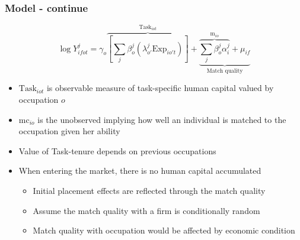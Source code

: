 \documentclass[11pt]{beamer}
\begin{document}
\begin{frame}
	\frametitle{Model - continue}
	\begin{equation*}
		\log{Y_{ifot}^j} = \gamma_o\overbrace{\left[  \sum_j \beta_{o}^j \left(\lambda_{o'}^j \text{Exp}_{io't} \right)\right]}^{\text{Task}_{iot}} + \underbrace{\overbrace{\sum_j \beta_{o}^j \alpha_{i}^j }^{\text{m}_{io}}+\mu_{if}}_{\text{Match quality}} \tag{6}
	\end{equation*}
	
	\begin{itemize}
		\item $\text{Task}_{iot}$ is observable measure of task-specific human capital valued by occupation $o$
		\item $\text{mc}_{io}$ is the unobserved implying how well an individual is matched to the occupation given her ability 
		\item Value of Task-tenure depends on previous occupations 
		\item When entering the market, there is no human capital accumulated
		\begin{itemize}
			\item Initial placement effects are reflected through the match quality
			\item Assume the match quality with a firm is conditionally random 
			\item Match quality with occupation would be affected by economic condition
		\end{itemize}
	\end{itemize}
	
\end{frame}
\end{document}
